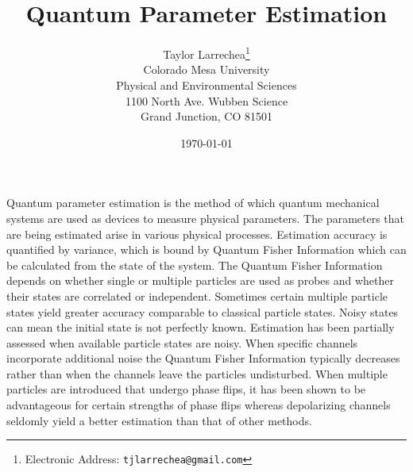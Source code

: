 \documentclass{article}
\title{\textbf{Quantum Parameter Estimation}}
\author{Taylor Larrechea\footnote{Electronic Address: \texttt{tjlarrechea@gmail.com}} \\
    Colorado Mesa University \\
    Physical and Environmental Sciences \\
    1100 North Ave. Wubben Science \\
    Grand Junction, CO 81501}
\date{\today}
\begin{document}
\maketitle
Quantum parameter estimation is the method of which quantum mechanical systems are used as devices to measure physical parameters. The parameters that are being estimated arise in various physical processes. Estimation accuracy is quantified by variance, which is bound by Quantum Fisher Information which can be calculated from the state of the system. The Quantum Fisher Information depends on whether single or multiple particles are used as probes and whether their states are correlated or independent. Sometimes certain multiple particle states yield greater accuracy comparable to classical particle states. Noisy states can mean the initial state is not perfectly known. Estimation has been partially assessed when available particle states are noisy. When specific channels incorporate additional noise the Quantum Fisher Information typically decreases rather than when the channels leave the particles undisturbed. When multiple particles are introduced that undergo phase flips, it has been shown to be advantageous for certain strengths of phase flips whereas depolarizing channels seldomly yield a better estimation than that of other methods.
\end{document}
